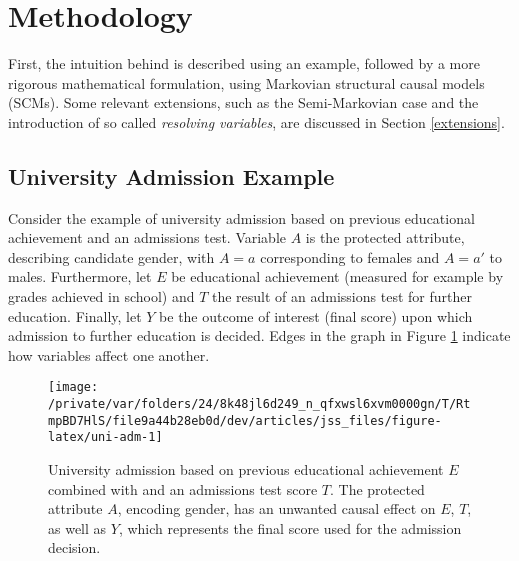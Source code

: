 \documentclass[
  nojss]{jss}
\begin{document}
\hypertarget{methodology}{%
\section{Methodology}\label{methodology}}

First, the intuition behind  is described using an
example, followed by a more rigorous mathematical formulation, using
Markovian structural causal models (SCMs). Some relevant extensions,
such as the Semi-Markovian case and the introduction of so called
\emph{resolving variables}, are discussed in Section \ref{extensions}.

\hypertarget{university-admission-example}{%
\subsection{University Admission
Example}\label{university-admission-example}}

Consider the example of university admission based on previous
educational achievement and an admissions test. Variable \(A\) is the
protected attribute, describing candidate gender, with \(A = a\)
corresponding to females and \(A = a'\) to males. Furthermore, let \(E\)
be educational achievement (measured for example by grades achieved in
school) and \(T\) the result of an admissions test for further
education. Finally, let \(Y\) be the outcome of interest (final score)
upon which admission to further education is decided. Edges in the graph
in Figure \ref{fig:uni-adm} indicate how variables affect one another.

\begin{CodeChunk}
\begin{figure}

{\centering \texttt{[image: /private/var/folders/24/8k48jl6d249\_n\_qfxwsl6xvm0000gn/T/RtmpBD7HlS/file9a44b28eb0d/dev/articles/jss\_files/figure-latex/uni-adm-1]} 

}

\caption[University admission based on previous educational achievement $E$ combined with and an admissions test score $T$]{University admission based on previous educational achievement $E$ combined with and an admissions test score $T$. The protected attribute $A$, encoding gender, has an unwanted causal effect on  $E$, $T$, as well as $Y$, which represents the final score used for the admission decision.}\label{fig:uni-adm}
\end{figure}
\end{CodeChunk}
\end{document}

